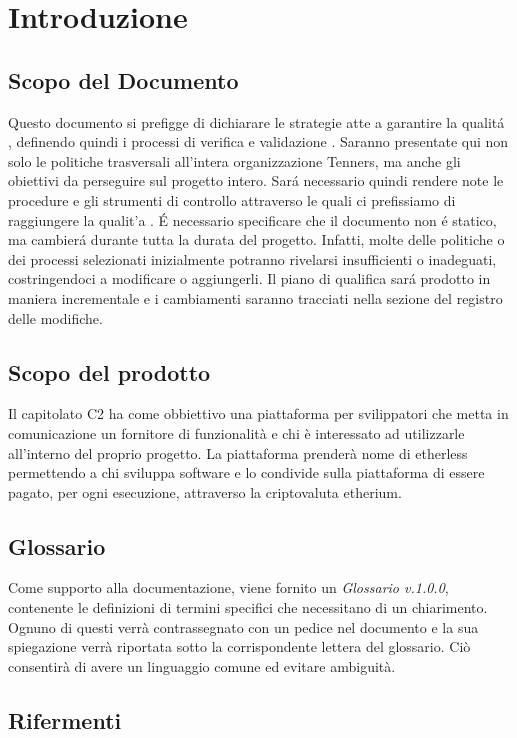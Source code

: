 \section{Introduzione}

\subsection{Scopo del Documento}
Questo documento si prefigge di dichiarare le strategie atte a garantire la qualit\'a \glo, definendo quindi i processi di verifica \glo e validazione \glo. Saranno presentate qui non solo le politiche trasversali all'intera organizzazione Tenners, ma anche gli obiettivi da perseguire sul progetto intero. Sar\'a necessario quindi rendere note le procedure e gli strumenti di controllo attraverso le quali ci prefissiamo di raggiungere la qualit'a \glo.
\'E necessario specificare che il documento non \'e statico, ma cambier\'a durante tutta la durata del progetto. Infatti, molte delle politiche o dei processi selezionati inizialmente potranno rivelarsi insufficienti o inadeguati, costringendoci a modificare o aggiungerli. Il piano di qualifica \glo sar\'a prodotto in maniera incrementale e i cambiamenti saranno tracciati nella sezione del registro delle modifiche.

\subsection{Scopo del prodotto}
Il capitolato C2 ha come obbiettivo una piattaforma per svilippatori che metta
in comunicazione un fornitore di funzionalit\`a e chi \`e interessato ad utilizzarle
all'interno del proprio progetto.
La piattaforma prender\`a nome di etherless permettendo a chi sviluppa software e
lo condivide sulla piattaforma di essere pagato, per ogni esecuzione, attraverso
la criptovaluta etherium.


\subsection{Glossario}
Come supporto alla documentazione, viene fornito un \textit{Glossario v.1.0.0},
contenente le definizioni di termini specifici che necessitano di un chiarimento.
Ognuno di questi verr\`a contrassegnato con un pedice \glo nel documento e la sua
spiegazione verr\`a riportata sotto la corrispondente lettera del glossario. Ci\`o
consentir\`a di avere un linguaggio comune ed evitare ambiguit\`a.

\subsection{Rifermenti}
